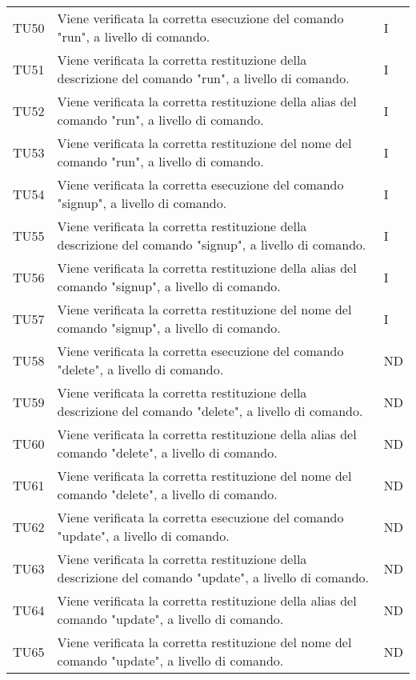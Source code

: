\begin{longtable}{|C{1.5cm}|C{10cm}|C{1.5cm}|}
	TU50 &
	Viene verificata la corretta esecuzione del comando "run", a livello di comando.  &
	I \\
	
	TU51 &
	Viene verificata la corretta restituzione della descrizione del comando "run", a livello di comando.  &
	I \\
	
	TU52 &
	Viene verificata la corretta restituzione della alias del comando "run", a livello di comando.  &
	I \\
	
	TU53 &
	Viene verificata la corretta restituzione del nome del comando "run", a livello di comando.  &
	I \\
	
	TU54 &
	Viene verificata la corretta esecuzione del comando "signup", a livello di comando.  &
	I \\
	
	TU55 &
	Viene verificata la corretta restituzione della descrizione del comando "signup", a livello di comando.  &
	I \\
	
	TU56 &
	Viene verificata la corretta restituzione della alias del comando "signup", a livello di comando.  &
	I \\
	
	TU57 &
	Viene verificata la corretta restituzione del nome del comando "signup", a livello di comando.  &
	I \\
	
	TU58 &
	Viene verificata la corretta esecuzione del comando "delete", a livello di comando.  &
	ND \\
	
	TU59 &
	Viene verificata la corretta restituzione della descrizione del comando "delete", a livello di comando.  &
	ND \\
	
	TU60 &
	Viene verificata la corretta restituzione della alias del comando "delete", a livello di comando.  &
	ND \\
	
	TU61 &
	Viene verificata la corretta restituzione del nome del comando "delete", a livello di comando.  &
	ND \\
	
	TU62 &
	Viene verificata la corretta esecuzione del comando "update", a livello di comando.  &
	ND \\
	
	TU63 &
	Viene verificata la corretta restituzione della descrizione del comando "update", a livello di comando.  &
	ND \\
	
	TU64 &
	Viene verificata la corretta restituzione della alias del comando "update", a livello di comando.  &
	ND \\
	
	TU65 &
	Viene verificata la corretta restituzione del nome del comando "update", a livello di comando.  &
	ND \\
\end{longtable}

